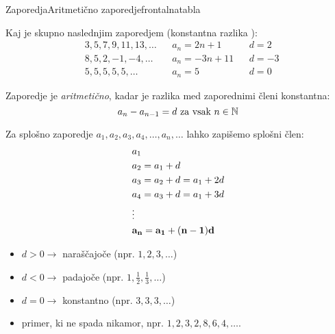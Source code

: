 \begin{priprava}{}{}{Zaporedja}{Aritmetično zaporedje}{frontalna}{tabla}

Kaj je skupno naslednjim zaporedjem (konstantna razlika ):
\begin{align*}
    & 3, 5, 7, 9, 11, 13, \ldots && a_n = 2n+1 && d = 2 \\
    & 8, 5, 2, -1, -4, \ldots && a_n = -3n+11 && d = -3 \\
    & 5, 5, 5, 5, 5, \ldots && a_n = 5 && d = 0
\end{align*}

Zaporedje je \emph{aritmetično}, kadar je razlika med zaporednimi členi konstantna:
$$ a_n - a_{n-1} = d \text{ za vsak } n \in \mathbb{N} $$

Za splošno zaporedje $ a_1, a_2, a_3, a_4, \ldots, a_n, \ldots $ lahko zapišemo splošni člen:
\begin{align*}
    & a_1 \\
    & a_2 = a_1 + d \\
    & a_3 = a_2 + d = a_1 + 2d \\
    & a_4 = a_3 + d = a_1 + 3d \\
    & \vdots \\
    & \bf{a_n = a_1 + (n-1)d}
\end{align*}

\begin{itemize}
    \item $ d > 0 \rightarrow $ naraščajoče (npr. $ 1, 2, 3, \ldots $)
    \item $ d < 0 \rightarrow $ padajoče (npr. $ 1, \frac{1}{2}, \frac{1}{3}, \ldots $)
    \item $ d = 0 \rightarrow $ konstantno (npr. $ 3, 3, 3, \ldots $)
    \item primer, ki ne spada nikamor, npr. $ 1, 2, 3, 2, 8, 6, 4, \ldots $.
\end{itemize}


\end{priprava}

